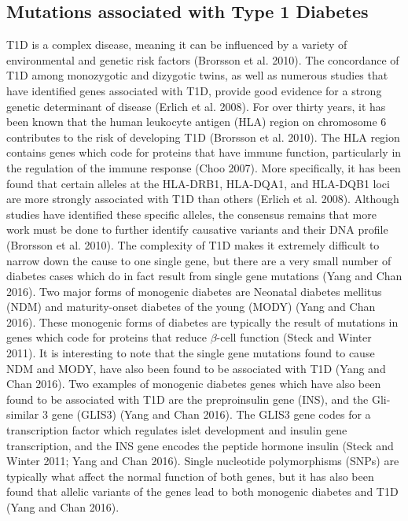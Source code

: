 \documentclass{article}
\begin{document}
\subsection{Mutations associated with Type 1 Diabetes}
T1D is a complex disease, meaning it can be influenced by a variety of environmental and genetic risk factors (Brorsson
et al. 2010). The concordance of T1D among monozygotic and dizygotic twins, as well as numerous studies that have identified
genes associated with T1D, provide good evidence for a strong genetic determinant of disease (Erlich et al. 2008). For over
thirty years, it has been known that the human leukocyte antigen (HLA) region on chromosome 6 contributes to the risk of
developing T1D (Brorsson et al. 2010). The HLA region contains genes which code for proteins that have immune function,
particularly in the regulation of the immune response (Choo 2007). More specifically, it has been found that certain alleles at
the HLA-DRB1, HLA-DQA1, and HLA-DQB1 loci are more strongly associated with T1D than others (Erlich et al. 2008).
Although studies have identified these specific alleles, the consensus remains that more work must be done to further identify
causative variants and their DNA profile (Brorsson et al. 2010). The complexity of T1D makes it extremely difficult to narrow
down the cause to one single gene, but there are a very small number of diabetes cases which do in fact result from single
gene mutations (Yang and Chan 2016). Two major forms of monogenic diabetes are Neonatal diabetes mellitus (NDM) and
maturity-onset diabetes of the young (MODY) (Yang and Chan 2016). These monogenic forms of diabetes are typically the
result of mutations in genes which code for proteins that reduce $\beta$-cell function (Steck and Winter 2011). It is interesting to
note that the single gene mutations found to cause NDM and MODY, have also been found to be associated with T1D (Yang
and Chan 2016). Two examples of monogenic diabetes genes which have also been found to be associated with T1D are the
preproinsulin gene (INS), and the Gli-similar 3 gene (GLIS3) (Yang and Chan 2016). The GLIS3 gene codes for a transcription
factor which regulates islet development and insulin gene transcription, and the INS gene encodes the peptide hormone insulin
(Steck and Winter 2011; Yang and Chan 2016). Single nucleotide polymorphisms (SNPs) are typically what affect the normal
function of both genes, but it has also been found that allelic variants of the genes lead to both monogenic diabetes and T1D
(Yang and Chan 2016).
\end{document}
